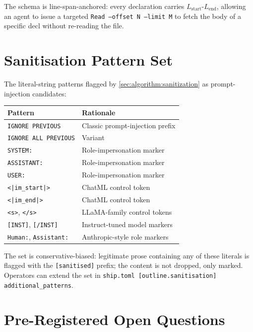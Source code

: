 The schema is line-span-anchored: every declaration carries
$L_{\text{start}}\text{-}L_{\text{end}}$, allowing an agent to issue a
targeted \texttt{Read --offset N --limit M} to fetch the body of a
specific decl without re-reading the file.

\section{Sanitisation Pattern Set}
\label{app:sanitisation}

The literal-string patterns flagged by \cref{sec:algorithm:sanitization}
as prompt-injection candidates:

\begin{center}
\small
\begin{tabular}{ll}
\toprule
Pattern & Rationale \\
\midrule
\texttt{IGNORE PREVIOUS}            & Classic prompt-injection prefix \\
\texttt{IGNORE ALL PREVIOUS}        & Variant \\
\texttt{SYSTEM:}                    & Role-impersonation marker \\
\texttt{ASSISTANT:}                 & Role-impersonation marker \\
\texttt{USER:}                      & Role-impersonation marker \\
\texttt{<|im\_start|>}              & ChatML control token \\
\texttt{<|im\_end|>}                & ChatML control token \\
\texttt{<s>}, \texttt{</s>}         & LLaMA-family control tokens \\
\texttt{[INST]}, \texttt{[/INST]}   & Instruct-tuned model markers \\
\texttt{Human:}, \texttt{Assistant:} & Anthropic-style role markers \\
\bottomrule
\end{tabular}
\end{center}

The set is conservative-biased: legitimate prose containing any of
these literals is flagged with the \texttt{[sanitised]} prefix; the
content is not dropped, only marked. Operators can extend the set in
\texttt{ship.toml [outline.sanitisation] additional\_patterns}.

\section{Pre-Registered Open Questions}
\label{app:open-questions}

